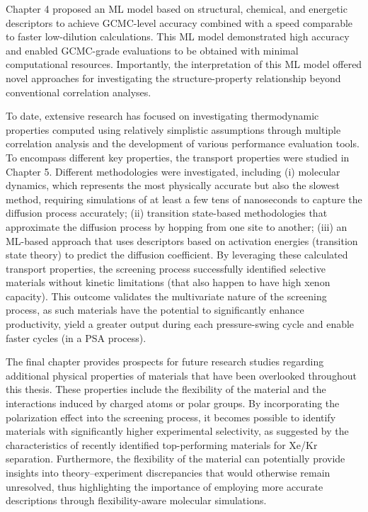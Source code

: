 Chapter 4 proposed an ML model based on structural, chemical, and energetic descriptors to achieve GCMC-level accuracy combined with a speed comparable to faster low-dilution calculations.\autocite{Ren_2023_ml} This ML model demonstrated high accuracy and enabled GCMC-grade evaluations to be obtained with minimal computational resources. Importantly, the interpretation of this ML model offered novel approaches for investigating the structure-property relationship beyond conventional correlation analyses.

To date, extensive research has focused on investigating thermodynamic properties computed using relatively simplistic assumptions through multiple correlation analysis and the development of various performance evaluation tools. To encompass different key properties, the transport properties were studied in Chapter 5. Different methodologies were investigated, including (i) molecular dynamics, which represents the most physically accurate but also the slowest method, requiring simulations of at least a few tens of nanoseconds to capture the diffusion process accurately; (ii) transition state-based methodologies that approximate the diffusion process by hopping from one site to another; (iii) an ML-based approach that uses descriptors based on activation energies (transition state theory) to predict the diffusion coefficient. By leveraging these calculated transport properties, the screening process successfully identified selective materials without kinetic limitations (that also happen to have high xenon capacity). This outcome validates the multivariate nature of the screening process, as such materials have the potential to significantly enhance productivity, yield a greater output during each pressure-swing cycle and enable faster cycles (in a PSA process). 

The final chapter provides prospects for future research studies regarding additional physical properties of materials that have been overlooked throughout this thesis. These properties include the flexibility of the material and the interactions induced by charged atoms or polar groups. By incorporating the polarization effect into the screening process, it becomes possible to identify materials with significantly higher experimental selectivity, as suggested by the characteristics of recently identified top-performing materials for Xe/Kr separation.\autocite{Li_2019,Pei_2022} Furthermore, the flexibility of the material can potentially provide insights into theory--experiment discrepancies that would otherwise remain unresolved, thus highlighting the importance of employing more accurate descriptions through flexibility-aware molecular simulations.

